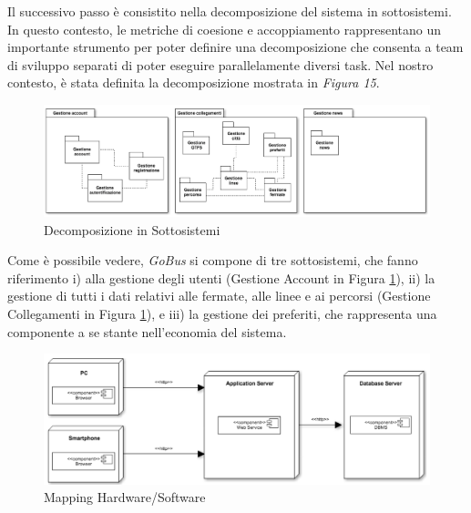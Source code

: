 Il successivo passo \`{e} consistito nella decomposizione del sistema in sottosistemi. In questo contesto, le metriche di coesione e accoppiamento rappresentano un importante strumento per poter definire una decomposizione che consenta a team di sviluppo separati di poter eseguire parallelamente diversi task. Nel nostro contesto, \`{e} stata definita la decomposizione mostrata in \emph{Figura 15}.

\begin{figure}[tb]
\centering
\includegraphics[scale=.4]{img/sd.png}
\caption{Decomposizione in Sottosistemi}
\label{fig:sd}
\end{figure} 

Come \`{e} possibile vedere, \emph{GoBus} si compone di tre sottosistemi, che fanno riferimento i) alla gestione degli utenti (Gestione Account in Figura \ref{fig:sd}), ii) la gestione di tutti i dati relativi alle fermate, alle linee e ai percorsi (Gestione Collegamenti in Figura \ref{fig:sd}), e iii) la gestione dei preferiti, che rappresenta una componente a se stante nell\rq economia del sistema.\\

\begin{figure}[tb]
\centering
\includegraphics[scale=.4]{img/mhs.png}
\caption{Mapping Hardware/Software}
\label{fig:mhs}
\end{figure} 

